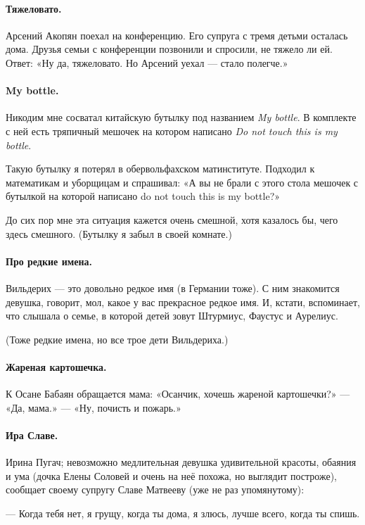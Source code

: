 \documentclass{book}
\begin{document}
\paragraph{Тяжеловато.}
Арсений Акопян поехал на конференцию.
Его супруга с тремя детьми осталась дома.
Друзья семьи с конференции позвонили и спросили, не тяжело ли ей.
Ответ: «Ну да, тяжеловато. Но Арсений уехал --- стало полегче.»


\paragraph{My bottle.}
Никодим мне сосватал китайскую бутылку под названием \textit{My bottle}.
В комплекте с ней есть тряпичный мешочек на котором написано \textit{Do not touch this is my bottle}.

Такую бутылку я потерял в обервольфахском матинституте.
Подходил к математикам и уборщицам и спрашивал: «А вы не брали с этого стола мешочек с бутылкой на которой написано do not touch this is my bottle?»

До сих пор мне эта ситуация кажется очень смешной, хотя казалось бы, чего здесь смешного.
(Бутылку я забыл в своей комнате.)

\paragraph{Про редкие имена.}
Вильдерих --- это довольно редкое имя (в Германии тоже).
С ним знакомится девушка, говорит, мол, какое у вас прекрасное редкое имя.
И, кстати, вспоминает, что слышала о семье, в которой детей зовут Штурмиус, Фаустус и Аурелиус.

(Тоже редкие имена, но все трое дети Вильдериха.)

\paragraph{Жареная картошечка.}
К Осане Бабаян обращается мама:
«Осанчик, хочешь жареной картошечки?» --- «Да, мама.» --- «Ну, почисть и пожарь.»

\paragraph{Ира Славе.}
Ирина Пугач; невозможно медлительная девушка удивительной красоты, обаяния и ума (дочка Елены Соловей и очень на неё похожа, но выглядит построже), сообщает своему супругу Славе Матвееву (уже не раз упомянутому):

--- Когда тебя нет, я грущу, когда ты дома, я злюсь, лучше всего, когда ты спишь.
\end{document}

